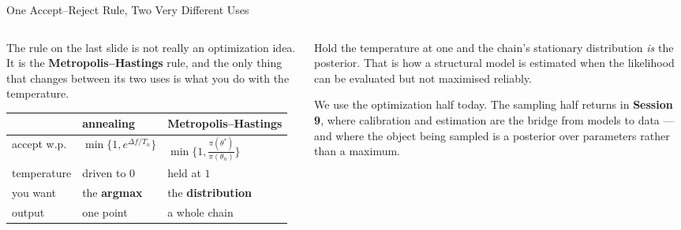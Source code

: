 \begin{frame}{One Accept--Reject Rule, Two Very Different Uses}
\begin{columns}[T]
\begin{column}{0.53\textwidth}
\small
The rule on the last slide is not really an optimization idea. It is the \textbf{Metropolis--Hastings} rule, and the only thing that changes between its two uses is what you do with the temperature.
\medskip
\begin{center}\footnotesize
\begin{tabularx}{\linewidth}{@{}>{\raggedright\arraybackslash}p{1.6cm} >{\raggedright\arraybackslash}X >{\raggedright\arraybackslash}X@{}}
\toprule
 & \textbf{annealing} & \textbf{Metropolis--Hastings} \\
\midrule
accept w.p. & $\min\{1,e^{\Delta f/T_n}\}$ & $\min\{1,\tfrac{\pi(\theta^{*})}{\pi(\theta_n)}\}$ \\
temperature & driven to $0$ & held at $1$ \\
you want & the \textbf{argmax} & the \textbf{distribution} \\
output & one point & a whole chain \\
\bottomrule
\end{tabularx}
\end{center}
\end{column}
\begin{column}{0.44\textwidth}
\begin{conceptbox}[title=\textbf{Why an economist cares}]\small
Hold the temperature at one and the chain's stationary distribution \emph{is} the posterior. That is how a structural model is estimated when the likelihood can be evaluated but not maximised reliably.
\end{conceptbox}
\medskip
\begin{takeawaybox}\footnotesize
We use the optimization half today. The sampling half returns in \textbf{Session 9}, where calibration and estimation are the bridge from models to data --- and where the object being sampled is a posterior over parameters rather than a maximum.
\end{takeawaybox}
\end{column}
\end{columns}
\vspace{1mm}
\end{frame}


